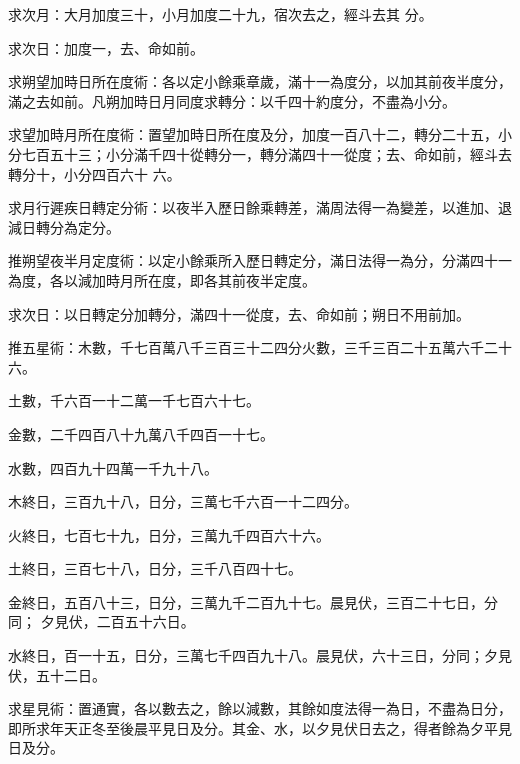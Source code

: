 \begin{pinyinscope}
 求次月：大月加度三十，小月加度二十九，宿次去之，經斗去其
 分。



 求次日：加度一，去、命如前。



 求朔望加時日所在度術：各以定小餘乘章歲，滿十一為度分，以加其前夜半度分，滿之去如前。凡朔加時日月同度求轉分：以千四十約度分，不盡為小分。



 求望加時月所在度術：置望加時日所在度及分，加度一百八十二，轉分二十五，小分七百五十三；小分滿千四十從轉分一，轉分滿四十一從度；去、命如前，經斗去轉分十，小分四百六十
 六。



 求月行遲疾日轉定分術：以夜半入歷日餘乘轉差，滿周法得一為變差，以進加、退減日轉分為定分。



 推朔望夜半月定度術：以定小餘乘所入歷日轉定分，滿日法得一為分，分滿四十一為度，各以減加時月所在度，即各其前夜半定度。



 求次日：以日轉定分加轉分，滿四十一從度，去、命如前；朔日不用前加。



 推五星術：木數，千七百萬八千三百三十二四分火數，三千三百二十五萬六千二十六。



 土數，千六百一十二萬一千七百六十七。



 金數，二千四百八十九萬八千四百一十七。



 水數，四百九十四萬一千九十八。



 木終日，三百九十八，日分，三萬七千六百一十二四分。



 火終日，七百七十九，日分，三萬九千四百六十六。



 土終日，三百七十八，日分，三千八百四十七。



 金終日，五百八十三，日分，三萬九千二百九十七。晨見伏，三百二十七日，分同；
 夕見伏，二百五十六日。



 水終日，百一十五，日分，三萬七千四百九十八。晨見伏，六十三日，分同；夕見伏，五十二日。



 求星見術：置通實，各以數去之，餘以減數，其餘如度法得一為日，不盡為日分，即所求年天正冬至後晨平見日及分。其金、水，以夕見伏日去之，得者餘為夕平見日及分。




\end{pinyinscope}
